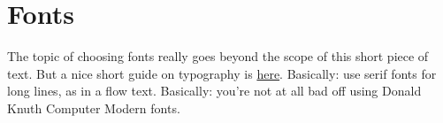 \documentclass{article}
\begin{document}
\section{Fonts}
The topic of choosing fonts really goes beyond the scope of this short piece of text.
But a nice short guide on typography is 
\href{https://www.pierrickcalvez.com/journal/a-five-minutes-guide-to-better-typography}{here}.
Basically: use serif fonts for long lines, as in a flow text.  
Basically: you're not at all bad off using Donald Knuth Computer Modern fonts.


 
\end{document}

